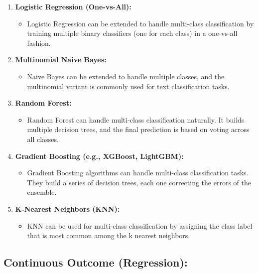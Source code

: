 \documentclass[
]{book}
\providecommand{\tightlist}{%
  \setlength{\itemsep}{0pt}\setlength{\parskip}{0pt}}
\begin{document}
\begin{enumerate}
\def\labelenumi{\arabic{enumi}.}
\tightlist
\item
  \textbf{Logistic Regression (One-vs-All):}

  \begin{itemize}
  \tightlist
  \item
    Logistic Regression can be extended to handle multi-class classification by training multiple binary classifiers (one for each class) in a one-vs-all fashion.
  \end{itemize}
\item
  \textbf{Multinomial Naive Bayes:}

  \begin{itemize}
  \tightlist
  \item
    Naive Bayes can be extended to handle multiple classes, and the multinomial variant is commonly used for text classification tasks.
  \end{itemize}
\item
  \textbf{Random Forest:}

  \begin{itemize}
  \tightlist
  \item
    Random Forest can handle multi-class classification naturally. It builds multiple decision trees, and the final prediction is based on voting across all classes.
  \end{itemize}
\item
  \textbf{Gradient Boosting (e.g., XGBoost, LightGBM):}

  \begin{itemize}
  \tightlist
  \item
    Gradient Boosting algorithms can handle multi-class classification tasks. They build a series of decision trees, each one correcting the errors of the ensemble.
  \end{itemize}
\item
  \textbf{K-Nearest Neighbors (KNN):}

  \begin{itemize}
  \tightlist
  \item
    KNN can be used for multi-class classification by assigning the class label that is most common among the k nearest neighbors.
  \end{itemize}
\end{enumerate}

\hypertarget{continuous-outcome-regression}{%
\subsection{Continuous Outcome (Regression):}\label{continuous-outcome-regression}}
\end{document}
